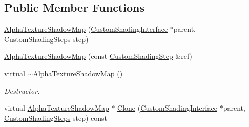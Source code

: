 \subsection*{Public Member Functions}
\begin{DoxyCompactItemize}
\item 
\mbox{\hyperlink{class_geometry_engine_1_1_custom_shading_1_1_alpha_texture_shadow_map_a16e60f631c844c7579e9f5070bfcb02f}{Alpha\+Texture\+Shadow\+Map}} (\mbox{\hyperlink{class_geometry_engine_1_1_custom_shading_1_1_custom_shading_interface}{Custom\+Shading\+Interface}} $\ast$parent, \mbox{\hyperlink{namespace_geometry_engine_1_1_custom_shading_a2dc236a5b567da5099069ce2b2be5609}{Custom\+Shading\+Steps}} step)
\item 
\mbox{\hyperlink{class_geometry_engine_1_1_custom_shading_1_1_alpha_texture_shadow_map_a48d3c0a306c157d9c56bfb68256a260c}{Alpha\+Texture\+Shadow\+Map}} (const \mbox{\hyperlink{class_geometry_engine_1_1_custom_shading_1_1_custom_shading_step}{Custom\+Shading\+Step}} \&ref)
\item 
\mbox{\label{class_geometry_engine_1_1_custom_shading_1_1_alpha_texture_shadow_map_a9204071cbf39806264d892d69fee6ce2}} 
virtual \mbox{\hyperlink{class_geometry_engine_1_1_custom_shading_1_1_alpha_texture_shadow_map_a9204071cbf39806264d892d69fee6ce2}{$\sim$\+Alpha\+Texture\+Shadow\+Map}} ()
\begin{DoxyCompactList}\small\item\em Destructor. \end{DoxyCompactList}\item 
virtual \mbox{\hyperlink{class_geometry_engine_1_1_custom_shading_1_1_alpha_texture_shadow_map}{Alpha\+Texture\+Shadow\+Map}} $\ast$ \mbox{\hyperlink{class_geometry_engine_1_1_custom_shading_1_1_alpha_texture_shadow_map_a5ff646b3f8b6da56acd2d98f09265769}{Clone}} (\mbox{\hyperlink{class_geometry_engine_1_1_custom_shading_1_1_custom_shading_interface}{Custom\+Shading\+Interface}} $\ast$parent, \mbox{\hyperlink{namespace_geometry_engine_1_1_custom_shading_a2dc236a5b567da5099069ce2b2be5609}{Custom\+Shading\+Steps}} step) const
\end{DoxyCompactItemize}
